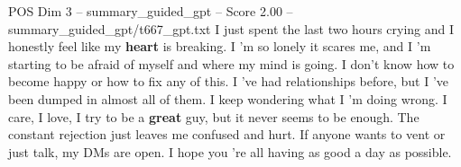 \begin{textsample}{POS Dim 3 – summary\_guided\_gpt – Score 2.00 – summary\_guided\_gpt/t667\_gpt.txt}  \label{ex:f3_pos_024}
I just spent the last two hours crying and I honestly feel like my \textbf{heart} is breaking.
I ’m so lonely it scares me, and I ’m starting to be afraid of myself and where my mind is going.
I don't know how to become happy or how to fix any of this.
I ’ve had relationships before, but I ’ve been dumped in almost all of them.
I keep wondering what I ’m doing wrong.
I care, I love, I try to be a \textbf{great} guy, but it never seems to be enough.
The constant rejection just leaves me confused and hurt.
If anyone wants to vent or just talk, my DMs are open.
I hope you ’re all having as good a day as possible.

\end{textsample}
